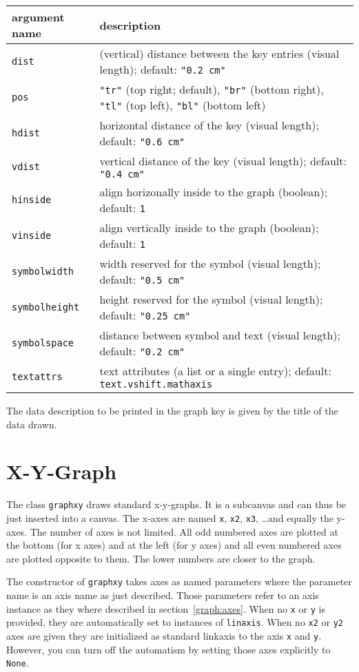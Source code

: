 \medskip
\begin{tabularx}{\linewidth}{l>{\raggedright\arraybackslash}X}
argument name&description\\
\hline
\texttt{dist}&(vertical) distance between the key entries (visual length); default: \texttt{"0.2 cm"}\\
\texttt{pos}&\texttt{"tr"} (top right; default), \texttt{"br"} (bottom right), \texttt{"tl"} (top left), \texttt{"bl"} (bottom left)\\
\texttt{hdist}&horizontal distance of the key (visual length); default: \texttt{"0.6 cm"}\\
\texttt{vdist}&vertical distance of the key (visual length); default: \texttt{"0.4 cm"}\\
\texttt{hinside}&align horizonally inside to the graph (boolean); default: \texttt{1}\\
\texttt{vinside}&align vertically inside to the graph (boolean); default: \texttt{1}\\
\texttt{symbolwidth}&width reserved for the symbol (visual length); default: \texttt{"0.5 cm"}\\
\texttt{symbolheight}&height reserved for the symbol (visual length); default: \texttt{"0.25 cm"}\\
\texttt{symbolspace}&distance between symbol and text (visual length); default: \texttt{"0.2 cm"}\\
\texttt{textattrs}&text attributes (a list or a single entry); default: \texttt{text.vshift.mathaxis}\\
\end{tabularx}
\medskip

The data description to be printed in the graph key is given by the
title of the data drawn.

\section{X-Y-Graph}

The class \verb|graphxy| draws standard x-y-graphs. It is a subcanvas
and can thus be just inserted into a canvas. The x-axes are named
\verb|x|, \verb|x2|, \verb|x3|, \dots and equally the y-axes. The
number of axes is not limited. All odd numbered axes are plotted at
the bottom (for x axes) and at the left (for y axes) and all even
numbered axes are plotted opposite to them. The lower numbers are
closer to the graph.

The constructor of \verb|graphxy| takes axes as named parameters where
the parameter name is an axis name as just described. Those parameters
refer to an axis instance as they where described in
section~\ref{graph:axes}. When no \verb|x| or \verb|y| is provided,
they are automatically set to instances of \verb|linaxis|. When no
\verb|x2| or \verb|y2| axes are given they are initialized as standard
linkaxis to the axis \verb|x| and \verb|y|. However, you can turn off
the automatism by setting those axes explicitly to \verb|None|.

